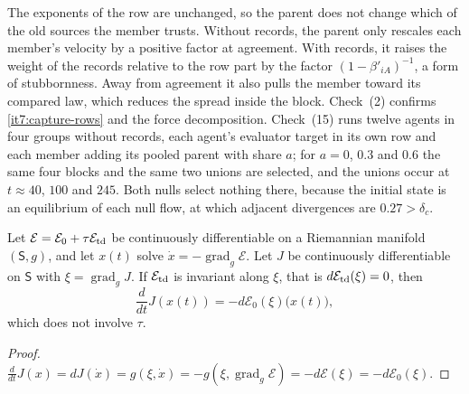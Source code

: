\documentclass[11pt,letterpaper]{report}
\begin{document}
The exponents of the row are unchanged, so the parent does not change which of the old sources the member trusts. Without records, the parent only rescales each member's velocity by a positive factor at agreement. With records, it raises the weight of the records relative to the row part by the factor $(1-\beta'_{iA})^{-1}$, a form of stubbornness. Away from agreement it also pulls the member toward its compared law, which reduces the spread inside the block. Check~(2) confirms \cref{it7:capture-rows} and the force decomposition. Check~(15) runs twelve agents in four groups without records, each agent's evaluator target in its own row and each member adding its pooled parent with share $a$; for $a=0$, $0.3$ and $0.6$ the same four blocks and the same two unions are selected, and the unions occur at $t\approx40$, $100$ and $245$. Both nulls select nothing there, because the initial state is an equilibrium of each null flow, at which adjacent divergences are $0.27>\delta_c$.

Let $\mathcal E=\mathcal E_0+\tau\mathcal E_{\rm td}$ be continuously differentiable on a Riemannian manifold $(\mathsf S,g)$, and let $x(t)$ solve $\dot x=-\operatorname{grad}_g\mathcal E$. Let $J$ be continuously differentiable on $\mathsf S$ with $\xi=\operatorname{grad}_gJ$. If $\mathcal E_{\rm td}$ is invariant along $\xi$, that is $d\mathcal E_{\rm td}(\xi)=0$, then
\begin{equation}
\frac{d}{dt}J(x(t))=-d\mathcal E_0(\xi)\bigl(x(t)\bigr),
\label{it7:momentum-rate}
\end{equation}
which does not involve $\tau$.
\begin{proof}
$\frac{d}{dt}J(x)=dJ(\dot x)=g(\xi,\dot x)=-g(\xi,\operatorname{grad}_g\mathcal E)=-d\mathcal E(\xi)=-d\mathcal E_0(\xi)$.
\end{proof}
\end{document}

